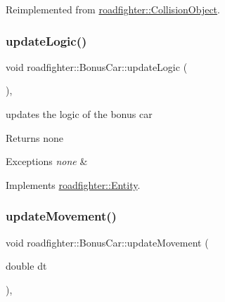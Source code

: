 Reimplemented from \hyperlink{classroadfighter_1_1CollisionObject_a55d891b6d9b50abdc44f964a40a7777c}{roadfighter\+::\+Collision\+Object}.

\mbox{\label{classroadfighter_1_1BonusCar_a21d55ad1e1595ac6c86ca20f8819778b}} 
\subsubsection{\texorpdfstring{update\+Logic()}{updateLogic()}}
{\footnotesize\ttfamily void roadfighter\+::\+Bonus\+Car\+::update\+Logic (\begin{DoxyParamCaption}{ }\end{DoxyParamCaption})\hspace{0.3cm}{\ttfamily [override]}, {\ttfamily [virtual]}}

updates the logic of the bonus car \begin{DoxyReturn}{Returns}
none 
\end{DoxyReturn}

\begin{DoxyExceptions}{Exceptions}
{\em none} & \\
\hline
\end{DoxyExceptions}


Implements \hyperlink{classroadfighter_1_1Entity_a54c00f1af306290bae3e4b84e196566b}{roadfighter\+::\+Entity}.

\mbox{\label{classroadfighter_1_1BonusCar_a2d3d584ca34a5df3b3c833123a9bbc30}} 
\subsubsection{\texorpdfstring{update\+Movement()}{updateMovement()}}
{\footnotesize\ttfamily void roadfighter\+::\+Bonus\+Car\+::update\+Movement (\begin{DoxyParamCaption}\item[{double}]{dt }\end{DoxyParamCaption})\hspace{0.3cm}{\ttfamily [override]}, {\ttfamily [virtual]}}

